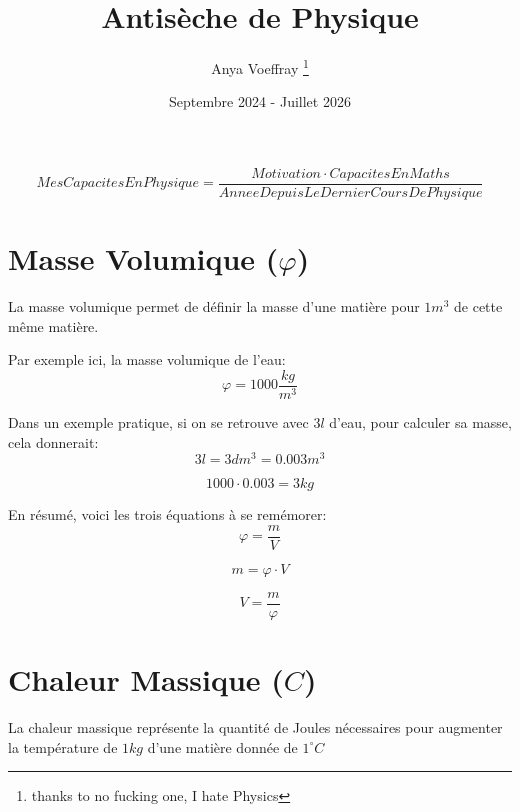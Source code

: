 \documentclass{article}
\title{Antisèche de Physique}
\author{Anya Voeffray \thanks{thanks to no fucking one, I hate Physics}}
\date{Septembre 2024 - Juillet 2026}
\begin{document}
\begin{titlepage}
\maketitle
\begin{equation}
	Mes Capacites En Physique =  \frac{Motivation \cdot Capacites En Maths}{Annee Depuis Le Dernier Cours De Physique}
\end{equation}


\end{titlepage}

\section{Masse Volumique ($\varphi$)}

La masse volumique permet de définir la masse d'une matière pour $1m^3$ de cette même matière.

Par exemple ici, la masse volumique de l'eau:
\begin{equation}
	\varphi = 1000 \frac{kg}{m^3}
\end{equation}

Dans un exemple pratique, si on se retrouve avec $3l$ d'eau, pour calculer sa masse, cela donnerait:
	\begin{equation}
		3l = 3dm^3 = 0.003m^3
	\end{equation}
	
	\begin{equation}
		1000 \cdot 0.003 = 3kg
	\end{equation}

En résumé, voici les trois équations à se remémorer:
\begin{equation}
	\varphi = \frac{m}{V}
\end{equation}

\begin{equation}
	m = \varphi \cdot V
\end{equation}

\begin{equation}
	V = \frac{m}{\varphi}
\end{equation}

\pagebreak

\section{Chaleur Massique ($C$)}

La chaleur massique représente la quantité de Joules nécessaires pour augmenter la température de $1kg$ d'une matière donnée de $1 ^\circ C$
\end{document}
